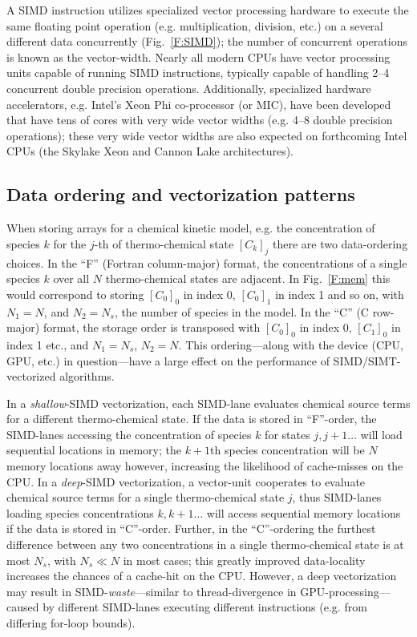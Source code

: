 \documentclass[12pt]{ussci}
\begin{document}
A SIMD instruction utilizes specialized vector processing hardware to execute the same floating point operation (e.g. multiplication, division, etc.) on a several different data concurrently (Fig.~\ref{F:SIMD}); the number of concurrent operations is known as the vector-width.
Nearly all modern CPUs have vector processing units capable of running SIMD instructions, typically capable of handling 2--4 concurrent double precision operations.
Additionally, specialized hardware accelerators, e.g. Intel's Xeon Phi co-processor (or MIC), have been developed that have tens of cores with very wide vector widths (e.g. 4--8 double precision operations); these very wide vector widths are also expected on forthcoming Intel CPUs (the Skylake Xeon and Cannon Lake architectures).

\subsection{Data ordering and vectorization patterns}
\label{S:data}
When storing arrays for a chemical kinetic model, e.g. the concentration of species $k$ for the $j$-th of thermo-chemical state $[C_k]_j$ there are two data-ordering choices.
In the ``F'' (Fortran column-major) format, the concentrations of a single species $k$ over all $N$ thermo-chemical states are adjacent.
In Fig.~\ref{F:mem} this would correspond to storing $[C_0]_0$ in index \num{0}, $[C_0]_1$ in index \num{1} and so on, with $N_1 = N$, and $N_2 = N_s$, the number of species in the model.
In the ``C'' (C row-major) format, the storage order is transposed with $[C_0]_0$ in index \num{0}, $[C_1]_0$ in index \num{1} etc., and $N_1 = N_s$, $N_2 = N$.
This ordering---along with the device (CPU, GPU, etc.) in question---have a large effect on the performance of SIMD\slash SIMT-vectorized algorithms.

In a \textit{shallow}-SIMD vectorization, each SIMD-lane evaluates chemical source terms for a different thermo-chemical state.
If the data is stored in ``F''-order, the SIMD-lanes accessing the concentration of species $k$ for states $j, j+1\ldots$ will load sequential locations in memory; the $k+1$th species concentration will be $N$ memory locations away however, increasing the likelihood of cache-misses on the CPU.
In a \textit{deep}-SIMD vectorization, a vector-unit cooperates to evaluate chemical source terms for a single thermo-chemical state $j$, thus SIMD-lanes loading species concentrations $k, k+1\ldots$ will access sequential memory locations if the data is stored in ``C''-order.
Further, in the ``C''-ordering the furthest difference between any two concentrations in a single thermo-chemical state is at most $N_s$, with $N_s \ll N$ in most cases; this greatly improved data-locality increases the chances of a cache-hit on the CPU.
However, a deep vectorization may result in SIMD-\textit{waste}---similar to thread-divergence in GPU-processing---caused by different SIMD-lanes executing different instructions (e.g. from differing for-loop bounds).
\end{document}
